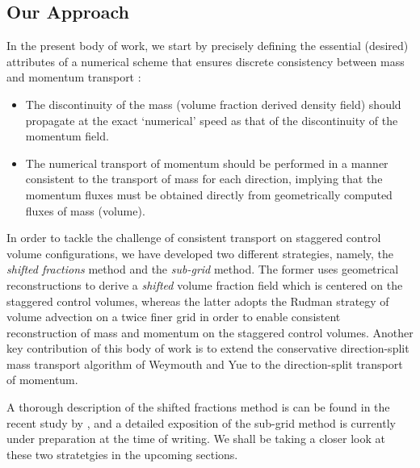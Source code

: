 


\subsection*{Our Approach}

In the present body of work, we start by precisely defining the
essential (desired) attributes of a numerical scheme that 
ensures discrete consistency between mass and momentum transport : 

\begin{itemize}
	\item The discontinuity of the mass (volume fraction 
		derived density field) should propagate at the 
		exact `numerical' speed as that of 
		the discontinuity of the momentum field. 
	\item The numerical transport of momentum should be performed 
		in a manner consistent to the transport of mass for 
		each direction, implying that the momentum fluxes must 
		be obtained directly from geometrically 
		computed fluxes of mass (volume). 
\end{itemize}

In order to tackle the challenge of consistent transport on staggered control 
volume configurations, we have developed two different strategies, namely, 
the \textit{shifted fractions} method and the \textit{sub-grid} method. 
The former uses geometrical reconstructions to derive a 
\textit{shifted} volume fraction field which is centered on the staggered
control volumes, whereas the latter adopts the Rudman \cite{rudman1998volume} 
strategy of volume advection on a twice finer grid in order to 
enable consistent reconstruction of mass and momentum on the staggered control volumes. 
Another key contribution of this body of work is to extend the conservative 
direction-split mass transport algorithm of Weymouth and Yue  
to the direction-split transport of momentum. 

A thorough description of the shifted fractions method is can be found in
the recent study by , and a detailed exposition of the
sub-grid method is currently under preparation at the time of writing.  
We shall be taking a closer look at these two stratetgies in the upcoming sections.  





